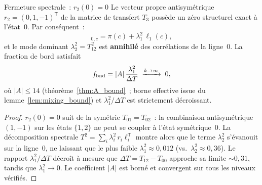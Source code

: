 \documentclass[12pt,a4paper]{article}
\begin{document}
\begin{thmbox}{Fermeture spectrale~: $r_2(0) = 0$}
\label{thm:spectral_closure}
Le vecteur propre antisymétrique $r_2 = (0, 1, -1)^{\mathsf{T}}$ de la
matrice de transfert $T_3$ possède un zéro structurel exact à
l'état~$0$. Par conséquent~:
\begin{equation}
  [T^2]_{0,c} = \pi(c) + \lambda_1^2\,\ell_1(c),
  \label{eq:T2_annihilation}
\end{equation}
et le mode dominant $\lambda_2^2 = T_{12}^2$ est \textbf{annihilé}
des corrélations de la ligne~$0$. La fraction de bord satisfait
\begin{equation}
  f_{\rm bnd} = |A|\,\frac{\lambda_1^2}{\Delta T}
  \;\xrightarrow{k\to\infty}\; 0,
  \label{eq:f_bnd}
\end{equation}
où $|A| \leq 14$ (théorème~\ref{thm:A_bound}~; borne effective issue
du lemme~\ref{lem:mixing_bound}) et $\lambda_1^2/\Delta T$ est
strictement décroissant.

\begin{proof}
$r_2(0) = 0$ suit de la symétrie $T_{01} = T_{02}$~: la combinaison
antisymétrique $(1,-1)$ sur les états $\{1,2\}$ ne peut se coupler à
l'état symétrique~$0$. La décomposition spectrale
$T^2 = \sum_i \lambda_i^2\,r_i \ell_i^{\mathsf{T}}$ montre alors que
le terme $\lambda_2^2$ s'évanouit sur la ligne~$0$, ne laissant que
le plus faible $\lambda_1^2 \approx 0{,}012$ (vs.\
$\lambda_2^2 \approx 0{,}36$). Le rapport $\lambda_1^2/\Delta T$
décroît à mesure que $\Delta T = T_{12} - T_{00}$ approche sa limite
$\sim 0{,}31$, tandis que $\lambda_1^2 \to 0$. Le coefficient $|A|$
est borné et convergent sur tous les niveaux vérifiés.
\end{proof}
\end{thmbox}
\end{document}
